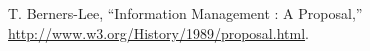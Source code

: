 
\begin{thebibliography}{xx}

T. Berners-Lee, 
``Information Management : A Proposal,''
\url{http://www.w3.org/History/1989/proposal.html}.

\end{thebibliography}


